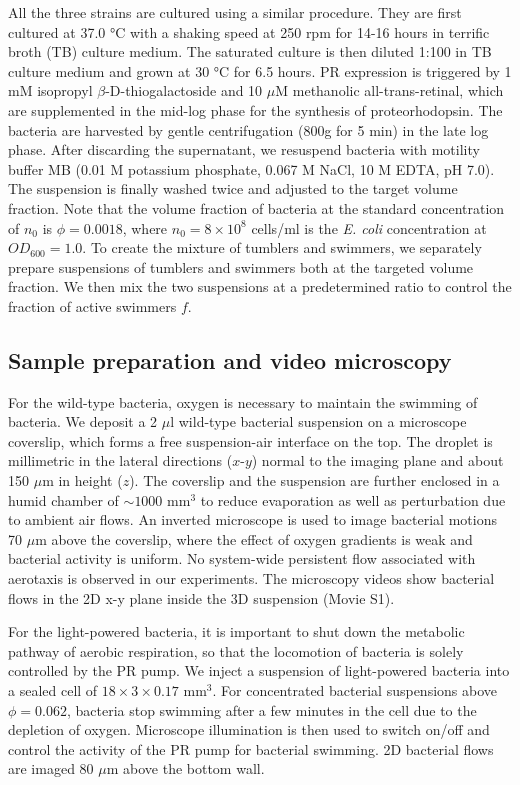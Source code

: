 All the three strains are cultured using a similar procedure. They are first cultured at 37.0 °C with a shaking speed at 250 rpm for 14-16 hours in terrific broth (TB) culture medium. The saturated culture is then diluted 1:100 in TB culture medium and grown at 30 °C for 6.5 hours. PR expression is triggered by 1 mM isopropyl $\beta$-D-thiogalactoside and 10 $\mu$M methanolic all-trans-retinal, which are supplemented in the mid-log phase for the synthesis of proteorhodopsin. The bacteria are harvested by gentle centrifugation (800g for 5 min) in the late log phase. After discarding the supernatant, we resuspend bacteria
with motility buffer MB (0.01 M potassium phosphate, 0.067 M NaCl, 10 M EDTA, pH 7.0). The suspension is finally washed twice and adjusted to the target volume fraction. Note that the volume fraction of bacteria at the standard concentration of $n_0$ is $\phi = 0.0018$, where $n_0 = 8 \times 10^8$ cells/ml is the \textit{E. coli} concentration at $OD_{600} = 1.0$. To create the mixture of tumblers and swimmers, we separately prepare suspensions of tumblers and swimmers both at the targeted volume fraction. We then mix the two suspensions at a predetermined ratio to control the fraction of active swimmers $f$.



\subsection{Sample preparation and video microscopy}
For the wild-type bacteria, oxygen is necessary to maintain the swimming of bacteria. We deposit a 2 $\mu$l wild-type bacterial suspension on a microscope coverslip, which forms a free suspension-air interface on the top. The droplet is millimetric in the lateral directions ($x$-$y$) normal to the imaging plane and about 150 $\mu$m in height ($z$). The coverslip and the suspension are further enclosed in a humid chamber of $\sim 1000$
mm$^3$ to reduce evaporation as well as perturbation due to ambient air flows. An inverted microscope is used to image bacterial motions 70 $\mu$m above the coverslip, where the effect of oxygen gradients is weak and bacterial activity is uniform. No system-wide persistent flow associated with aerotaxis is observed in our experiments. The microscopy videos show bacterial flows in the 2D x-y plane inside the 3D suspension (Movie S1).

For the light-powered bacteria, it is important to shut down the metabolic pathway of aerobic respiration, so that the locomotion of bacteria is solely controlled by the PR pump. We inject a suspension of light-powered bacteria into a sealed cell of $18 \times 3 \times 0.17$ mm$^3$. For concentrated bacterial suspensions above $\phi = 0.062$, bacteria stop swimming after a few minutes in the cell due to the depletion of oxygen. Microscope illumination is then used to switch on/off and control the activity of the PR pump for bacterial swimming. 2D bacterial flows are imaged 80 $\mu$m above the bottom wall.

